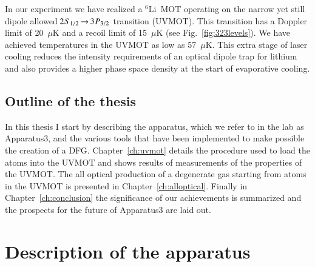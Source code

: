\documentclass[oneside,12pt]{memoir}
\newcommand{\twos}[1]{\ensuremath{\hspace{-1pt}2\hspace{0.5pt}\hspace{0pt}S_{#1}\hspace{-1pt}}}
\newcommand{\trep}[1]{\ensuremath{\hspace{-1pt}3\hspace{0.5pt}\hspace{0pt}P_{#1}\hspace{-1pt}}}
\newcommand{\uv}{\ensuremath{ \twos{1/2}\hspace{-0.0pt}\rightarrow\hspace{-0.0pt}\trep{3/2} }\ }
\newcommand{\li} {\ensuremath{^{6}}Li\ }
\begin{document}
In our experiment we have realized a \li MOT operating on the narrow yet still
dipole allowed \uv transition (UVMOT). This transition has a Doppler limit of
20~$\mu$K and a recoil limit of 15~$\mu$K (see Fig.~\ref{fig:323levels}).   We
have achieved temperatures in the UVMOT as low as 57~$\mu$K.   This extra stage
of laser cooling reduces the intensity requirements of an optical dipole trap
for lithium and also provides a higher phase space density at the start of
evaporative cooling.  

\section{Outline of the thesis} 

In this thesis I start by describing the apparatus, which we refer to in the lab as
Apparatus3, and the various tools that have been implemented to make possible
the creation of a DFG.    Chapter~\ref{ch:uvmot} details the procedure used to
load the atoms into the UVMOT and shows results of measurements of the
properties of the UVMOT.  The all optical production of a degenerate gas
starting from atoms in the UVMOT is presented in Chapter~\ref{ch:alloptical}.
Finally in Chapter~\ref{ch:conclusion} the significance of our achievements is
summarized and the prospects for the future of Apparatus3 are laid out.  


\chapter{Description of the apparatus}
\label{ch:desc}
\end{document}
